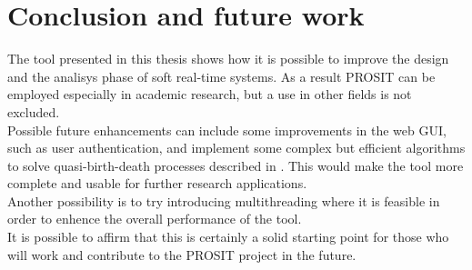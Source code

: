 \chapter{Conclusion and future work}\label{chp:conclusion}


The tool presented in this thesis shows how it is possible to improve the design and the analisys phase of soft real-time systems. As a result PROSIT can be employed especially in academic research, but a use in other fields is not excluded.\\
Possible future enhancements can include some improvements in the web GUI, such as user authentication, and implement some complex but efficient algorithms to solve quasi-birth-death processes described in \cite{futurework}. This would make the tool more complete and usable for further research applications.\\
Another possibility is to try introducing multithreading where it is feasible in order to enhence the overall performance of the tool.\\
It is possible to affirm that this is certainly a solid starting point for those who will work and contribute to the PROSIT project in the future.      

%
%
